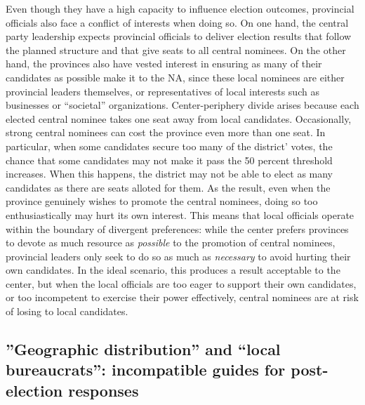 \documentclass[12pt]{article}\usepackage[]{graphicx}\usepackage[]{color}
\newcommand{\1}{\mathbbm{1}}
\begin{document}
Even though they have a high capacity to influence election outcomes, provincial officials also face a conflict of interests when doing so. On one hand, the central party leadership expects provincial officials to deliver election results that follow the planned structure and that give seats to all central nominees. On the other hand, the provinces also have vested interest in ensuring as many of their candidates as possible make it to the NA, since these local nominees are either provincial leaders themselves, or representatives of local interests such as businesses or ``societal'' organizations. Center-periphery divide arises because each elected central nominee takes one seat away from local candidates. Occasionally, strong central nominees can cost the province even more than one seat. In particular, when some candidates secure too many of the district' votes, the chance that some candidates may not make it pass the 50 percent threshold increases. When this happens, the district may not be able to elect as many candidates as there are seats alloted for them. As the result, even when the province genuinely wishes to promote the central nominees, doing so too enthusiastically may hurt its own interest. This means that local officials operate within the boundary of divergent preferences: while the center prefers provinces to devote as much resource as \textit{possible} to the promotion of central nominees, provincial leaders only seek to do so as much as \textit{necessary} to avoid hurting their own candidates. In the ideal scenario, this produces a result acceptable to the center, but when the local officials are too eager to support their own candidates, or too incompetent to exercise their power effectively, central nominees are at risk of losing to local candidates.

\subsection{''Geographic distribution'' and ``local bureaucrats'': incompatible guides for post-election responses}
\end{document}

